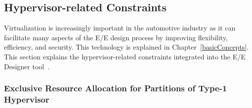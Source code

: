     \subsection{Hypervisor-related Constraints}
        
        Virtualization is increasingly important in the automotive industry as it can facilitate many aspects of the E/E design process by improving flexibility, efficiency, and security. This technology is explained in Chapter~\ref{basicConcepts}. This section explains the hypervisor-related constraints integrated into the E/E Designer tool~\cite{10588416}.  
            
        \subsubsection{Exclusive Resource Allocation for Partitions of Type-1 Hypervisor}    
        
